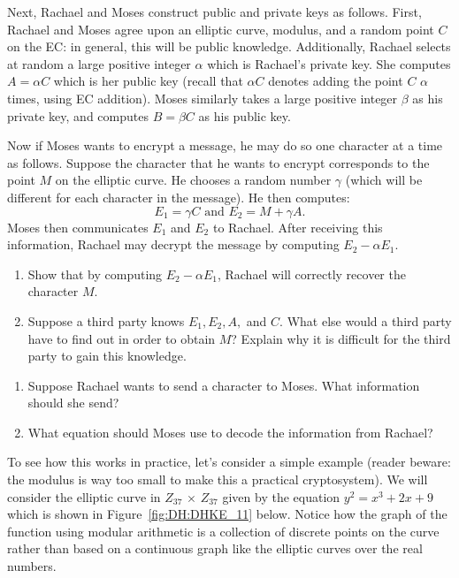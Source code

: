 Next, Rachael and Moses construct public and private keys as follows. First, Rachael and Moses agree upon an elliptic curve, modulus, and a random point $C$ on the EC: in general, this will be public knowledge.  Additionally, Rachael selects at  random a large positive integer $\alpha$ which is  Rachael's private key. She computes $A = \alpha C$ which is her public key (recall that $\alpha C$ denotes adding the point $C$ $\alpha$ times, using EC addition). Moses similarly takes a large positive integer $\beta$ as his private key, and computes $B = \beta C$ as his public key.

Now if Moses wants to encrypt a message, he may do so one character at a time as follows. Suppose the character that he wants to encrypt corresponds to the point $M$ on the elliptic curve.   He chooses a random number $\gamma$ (which will be different for each character in the message). He then computes:
\[
E_1=\gamma C \text{   and   }
E_2 = M +  \gamma A. 
\]
Moses then communicates $E_1$ and $E_2$ to  Rachael.  After receiving this information, Rachael may decrypt the message by computing $E_2 - \alpha E_1$.

\begin{exercise}{}
\begin{enumerate}[a]
\item
Show that by computing $E_2 - \alpha E_1$, Rachael will correctly recover  the character $M$.
\item
Suppose a third party knows $E_1, E_2, A,$ and $C$. What else would a third party have to find out in order to obtain $M$?  Explain why it is difficult for the third party to gain this knowledge.
\end{enumerate}
\end{exercise}

\begin{exercise}{}
\begin{enumerate}[a]
\item
Suppose Rachael wants to send a character to Moses.  What information should she send?
\item
What equation should Moses use to decode the information from Rachael?
\end{enumerate}
\end{exercise}

To see how this works in practice, let's consider a simple example (reader beware: the modulus is way too small to make this a practical cryptosystem). We will consider the elliptic curve in $Z_{37}$ $\times$ $Z_{37}$ given by the equation $y^2 = x^3 + 2x + 9$ which is shown in Figure~\ref{fig:DH:DHKE_11} below. Notice how the graph of the function using modular arithmetic is a collection of discrete points on the curve rather than based on a continuous graph like the elliptic curves over the real numbers.

